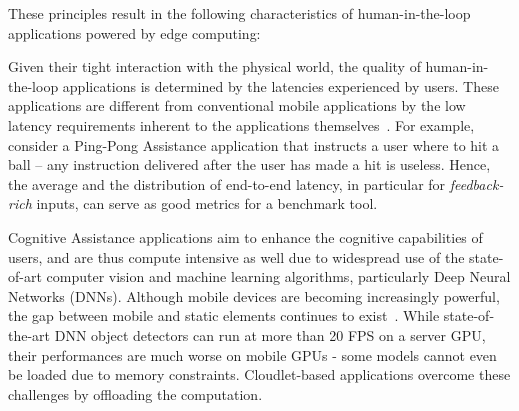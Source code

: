 
These principles result in the following characteristics of human-in-the-loop applications powered by edge computing:

\begin{description}[labelindent=\parindent, listparindent=\parindent, style=unboxed, leftmargin=0cm]
	\item[Latency Sensitive:] Given their tight interaction with the physical world, the quality of human-in-the-loop applications is determined by the latencies experienced by users. 
    These applications are different from conventional mobile applications by the low latency requirements inherent to the applications themselves~\cite{Suzuki,Chen:AnEmpiricalStudyOfLatency}. 
    For example, consider a Ping-Pong Assistance application that instructs a user where to hit a ball -- any instruction delivered after the user has made a hit is useless.
  Hence, the average and the distribution of end-to-end latency, in particular for \emph{feedback-rich} inputs, can serve as good metrics for a benchmark tool. 
	
    \item[Compute Intensive:] Cognitive Assistance applications aim to enhance the cognitive capabilities of users, and are thus compute intensive as well due to widespread use of the state-of-art computer vision and machine learning algorithms, particularly Deep Neural Networks (DNNs). 
    Although mobile devices are becoming increasingly powerful, the gap between mobile and static elements continues to exist~\cite{flinn2012cyber}. 
    While state-of-the-art DNN object detectors can run at more than 20 FPS on a server GPU, their performances are much worse on mobile GPUs - some models cannot even be loaded due to memory constraints. 
    Cloudlet-based applications overcome these challenges by offloading the computation. 

\end{description}


